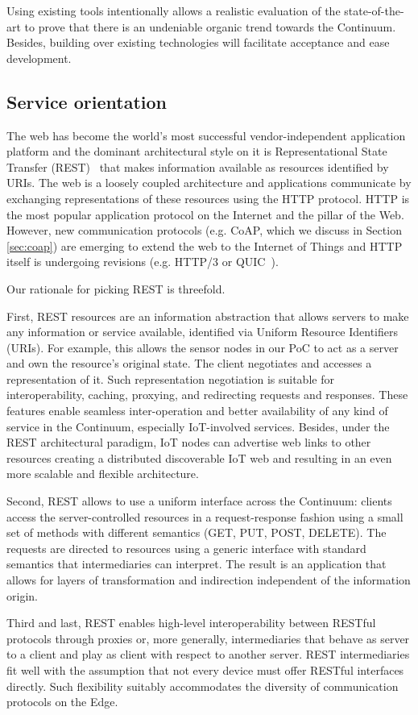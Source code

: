 Using existing tools intentionally allows a realistic evaluation of the state-of-the-art to prove that there is an undeniable organic trend towards the Continuum. Besides, building over existing technologies will facilitate acceptance and ease development.

\subsection{Service orientation}

The web has become the world's most successful vendor-independent application platform and the dominant architectural style on it is Representational State Transfer (REST)~\cite{rest} that makes information available as resources identified by URIs. The web is a loosely coupled architecture and applications communicate by exchanging representations of these resources using the HTTP protocol. HTTP is the most popular application protocol on the Internet and the pillar of the Web. However, new communication protocols (e.g. CoAP, which we discuss in Section \ref{sec:coap}) are emerging to extend the web to the Internet of Things and HTTP itself is undergoing revisions (e.g. HTTP/3 or QUIC~\cite{langley2017quic}).

Our rationale for picking REST is threefold.\par
First, REST resources are an information abstraction that allows servers to make any information or service available, identified via Uniform Resource Identifiers (URIs). For example, this allows the sensor nodes in our PoC to act as a server and own the resource's original state. The client negotiates and accesses a representation of it. Such representation negotiation is suitable for interoperability, caching, proxying, and redirecting requests and responses. These features enable seamless inter-operation and better availability of any kind of service in the Continuum, especially IoT-involved services. Besides, under the REST architectural paradigm, IoT nodes can advertise web links to other resources creating a distributed discoverable IoT web and resulting in an even more scalable and flexible architecture.\par
Second, REST allows to use a uniform interface across the Continuum: clients access the server-controlled resources in a request-response fashion using a small set of methods with different semantics (GET, PUT, POST, DELETE). The requests are directed to resources using a generic interface with standard semantics that intermediaries can interpret. The result is an application that allows for layers of transformation and indirection independent of the information origin. \par
Third and last, REST enables high-level interoperability between RESTful protocols through proxies or, more generally, intermediaries that behave as server to a client and play as client with respect to another server. REST intermediaries fit well with the assumption that not every device must offer RESTful interfaces directly. Such flexibility suitably accommodates the diversity of communication protocols on the Edge.

